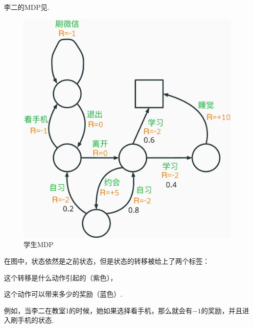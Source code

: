 \begin{example}[李二MDP]
李二的MDP见. 
\begin{figure}
    \centering
    \includegraphics[height=0.4\textheight]{Figures/Markov-chain/STD.eps}
    \caption{学生MDP}
    \label{fig:studentMDP}
\end{figure}
在图中，状态依然是之前状态，但是状态的转移被给上了两个标签：
\begin{enumerate*}[label=(\arabic*)]
    \item 这个转移是什么动作引起的（紫色），
    \item 这个动作可以带来多少的奖励（蓝色）. 
\end{enumerate*}
例如，当李二在教室1的时候，她如果选择看手机，那么就会有$-1$的奖励，并且进入刷手机的状态. 
\end{example}

